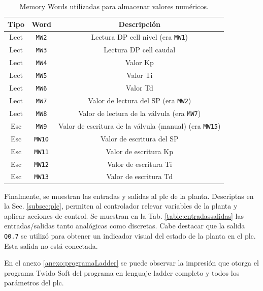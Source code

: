 \begin{table}[!t]

\renewcommand{\arraystretch}{1.3}
\centering
\begin{tabular}{c||c||c}
\hline
\bfseries Tipo & \bfseries Word  & \bfseries Descripción\\
\hline \hline
Lect & \verb|MW2|  & Lectura DP cell nivel (era \verb|MW1|)\\
Lect & \verb|MW3|  & Lectura DP cell caudal\\
Lect & \verb|MW4|  & Valor Kp\\
Lect & \verb|MW5|  & Valor Ti\\
Lect & \verb|MW6|  & Valor Td\\
Lect & \verb|MW7|  & Valor de lectura del SP (era \verb|MW2|)\\
Lect & \verb|MW8|  & Valor de lectura de la válvula (era \verb|MW7|)\\
\hline
Esc & \verb|MW9| & Valor de escritura de la válvula (manual) (era 
\verb|MW15|) \\
Esc & \verb|MW10|  & Valor de escritura del SP \\
Esc & \verb|MW11|  & Valor de escritura Kp \\
Esc & \verb|MW12|  & Valor de escritura Ti \\
Esc & \verb|MW13| & Valor de escritura Td \\
\hline
\end{tabular}
\caption{Memory Words utilizadas para almacenar valores numéricos.}
\label{table:mwNumericos}
\end{table}

Finalmente, se muestran las entradas y salidas al \gls{plc} de la planta.
Descriptas en la Sec. \ref{subsec:plc}, permiten al
controlador relevar variables de la planta y aplicar acciones de control. 
Se muestran en la Tab. \ref{table:entradassalidas} las
entradas/salidas tanto analógicas como discretas.
Cabe destacar que la salida \verb|Q0.7| se utilizó para obtener un indicador
visual del estado de la planta en el plc.
Esta salida no está conectada.

En el anexo \ref{anexo:programaLadder} se puede
observar la impresión que otorga el programa Twido Soft del programa en 
lenguaje ladder completo y todos los parámetros del \gls{plc}.

